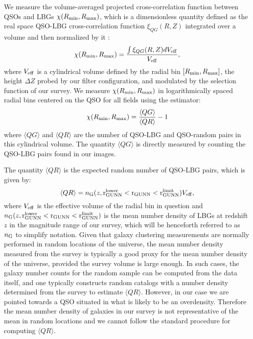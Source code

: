\documentclass[iop, revtex4]{emulateapj}
\begin{document}
We measure the volume-averaged projected cross-correlation
function between QSOs and LBGs $\chi (R_{\rm min}, R_{\rm max})$,
which is a dimensionless quantity defined as the real space
QSO-LBG cross-correlation function $\xi_{QG} (R,Z)$ integrated over a volume
and then normalized by it \citep[e.g.][]{Hennawi06, Hennawi15}:
\begin{equation}
\chi (R_{\rm min}, R_{\rm max}) = \frac{\int \xi_{QG} (R,Z)  dV_{\rm eff}}{V_{\rm eff}}, 
\label{eq:estimator2_simpler}
\end{equation}
where $V_{\rm eff}$ is a cylindrical volume defined by the radial bin $[R_{\rm min}, R_{\rm max}]$,
the height $\Delta Z$ probed by our filter configuration, and modulated by the selection function
of our survey. We measure  $\chi (R_{\rm min}, R_{\rm max})$ in logarithmically spaced radial bins centered on
the QSO for all fields using the estimator:
\begin{equation}
\chi (R_{\rm min}, R_{\rm max})=  \frac{\langle QG\rangle}{\langle QR\rangle} -1 
\label{eq:estimator}
\end{equation}
where $\langle QG\rangle$ and $\langle QR\rangle$ are the number of QSO-LBG and QSO-random pairs in this
cylindrical volume.
The quantity $\langle QG\rangle$ is directly measured by counting the QSO-LBG
pairs found in our images.

The quantity $\langle QR\rangle$ is the expected random number of QSO-LBG pairs, which is given by:
\begin{equation}
\langle QR\rangle =  n_{\rm G}(z,{\rm r_{GUNN}^{lower}}<{\rm r_{GUNN}}<{\rm r_{GUNN}^{limit}}) V_{\rm eff}, 
\label{eq:NLBG2}
\end{equation}
where $V_{\rm eff}$ is the effective volume of the radial bin in
question and $n_{\rm G}(z,{\rm r_{GUNN}^{lower}}<{\rm r_{GUNN}}<{\rm
  r_{GUNN}^{limit}})$ is the mean number density of LBGs at redshift
$z$ in the magnitude range of our survey, which will be henceforth
referred to as $n_{\rm G}$ to simplify notation. Given that galaxy
clustering measurements are normally performed in
random locations of the universe, 
the mean number density
measured from the survey is typically a good proxy for the
mean number density of the universe, provided the survey
volume is large enough. In such cases, the galaxy number
counts for the random sample can be computed
from the data itself, and one typically constructs
random catalogs with a number density determined from the survey
to estimate $\langle QR\rangle$. However, in our case we are pointed
towards a QSO situated in what is likely to be an overdensity. 
Therefore the mean number density
of galaxies in our survey is not representative of the mean in random locations and
 we cannot follow the standard procedure for computing $\langle QR\rangle$.
\end{document}
